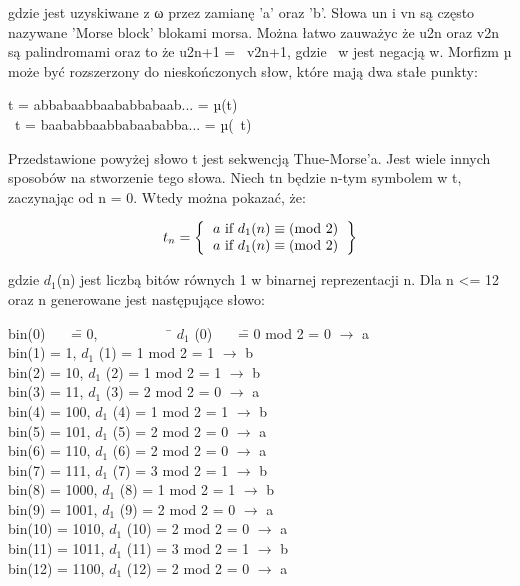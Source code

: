 \documentclass[document]{xmgr}
\begin{document}
gdzie  jest uzyskiwane z ω przez zamianę 'a' oraz 'b'. Słowa un i vn są często nazywane 'Morse block' blokami morsa. Można łatwo zauważyc że u2n oraz v2n są palindromami oraz to że u2n+1 = ~v2n+1, gdzie ~w jest negacją w. Morfizm µ może być rozszerzony do nieskończonych słow, które mają dwa stałe punkty:
\begin{center}
t = abbabaabbaababbabaab... = µ(t)\\
~t = baababbaabbabaababba... = µ(~t)
\end{center}
Przedstawione powyżej słowo t jest sekwencją Thue-Morse'a. Jest wiele innych sposobów na stworzenie tego słowa. Niech tn będzie n-tym symbolem w t, zaczynając od n = 0. Wtedy można pokazać, że:

\[
t_n=
\left \{
\begin{tabular}{ccc}
$a\ \textrm{if}\ d_1(n) \equiv (\textrm{mod}\ 2)$ \\
$a\ \textrm{if}\ d_1(n) \equiv (\textrm{mod}\ 2)$
\end{tabular}
\right \}
\]

gdzie $d_1$(n) jest liczbą bitów równych 1 w binarnej reprezentacji n. Dla n <= 12 oraz n generowane jest następujące słowo:

\begin{tabbing}
bin(0)~~~ \= = 0,~~~~~~~~~~ \= $d_1$ (0)~~~ \= = 0 mod 2 = 0 $\to$ a \\
bin(1) \> = 1, \> $d_1$ (1) \> = 1 mod 2 = 1 $\to$ b\\
bin(2) \> = 10, \> $d_1$ (2) \> = 1 mod 2 = 1 $\to$ b\\
bin(3) \> = 11, \> $d_1$ (3) \> 	= 2 mod 2 = 0 $\to$ a\\
bin(4) \> = 100, \> $d_1$ (4) \> = 1 mod 2 = 1 $\to$ b\\
bin(5) \> = 101, \> $d_1$ (5) \> 	= 2 mod 2 = 0 $\to$ a\\
bin(6) \> = 110, \> $d_1$ (6) \> = 2 mod 2 = 0 $\to$ a\\
bin(7) \> = 111, \> $d_1$ (7) \> = 3 mod 2 = 1 $\to$ b\\
bin(8) \> = 1000, \> $d_1$ (8) \> = 1 mod 2 = 1 $\to$ b\\
bin(9) \> = 1001, \> $d_1$ (9) \> = 2 mod 2 = 0 $\to$ a\\
bin(10) \> = 1010,	\> $d_1$ (10) \> = 2 mod 2 = 0 $\to$ a\\
bin(11) \> = 1011, 	\> $d_1$ (11) \> = 3 mod 2 = 1 $\to$ b\\
bin(12) \> = 1100, 	\> $d_1$ (12) \> = 2 mod 2 = 0 $\to$ a
\end{tabbing}
\end{document}

